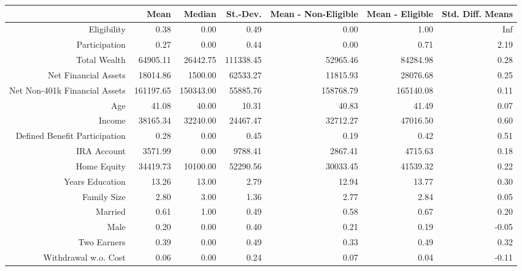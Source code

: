 \begin{table}[ht]
\centering
\begin{tabular}{rrrrrrr}
  \hline
 & Mean & Median & St.-Dev. & Mean - Non-Eligible & Mean - Eligible & Std. Diff. Means \\ 
  \hline
Eligibility & 0.38 & 0.00 & 0.49 & 0.00 & 1.00 & Inf \\ 
  Participation & 0.27 & 0.00 & 0.44 & 0.00 & 0.71 & 2.19 \\ 
  Total Wealth & 64905.11 & 26442.75 & 111338.45 & 52965.46 & 84284.98 & 0.28 \\ 
  Net Financial Assets & 18014.86 & 1500.00 & 62533.27 & 11815.93 & 28076.68 & 0.25 \\ 
  Net Non-401k Financial Assets & 161197.65 & 150343.00 & 55885.76 & 158768.79 & 165140.08 & 0.11 \\ 
  Age & 41.08 & 40.00 & 10.31 & 40.83 & 41.49 & 0.07 \\ 
  Income & 38165.34 & 32240.00 & 24467.47 & 32712.27 & 47016.50 & 0.60 \\ 
  Defined Benefit Participation & 0.28 & 0.00 & 0.45 & 0.19 & 0.42 & 0.51 \\ 
  IRA Account & 3571.99 & 0.00 & 9788.41 & 2867.41 & 4715.63 & 0.18 \\ 
  Home Equity & 34419.73 & 10100.00 & 52290.56 & 30033.45 & 41539.32 & 0.22 \\ 
  Years Education & 13.26 & 13.00 & 2.79 & 12.94 & 13.77 & 0.30 \\ 
  Family Size & 2.80 & 3.00 & 1.36 & 2.77 & 2.84 & 0.05 \\ 
  Married & 0.61 & 1.00 & 0.49 & 0.58 & 0.67 & 0.20 \\ 
  Male & 0.20 & 0.00 & 0.40 & 0.21 & 0.19 & -0.05 \\ 
  Two Earners & 0.39 & 0.00 & 0.49 & 0.33 & 0.49 & 0.32 \\ 
  Withdrawal w.o. Cost & 0.06 & 0.00 & 0.24 & 0.07 & 0.04 & -0.11 \\ 
   \hline
\end{tabular}
\end{table}
